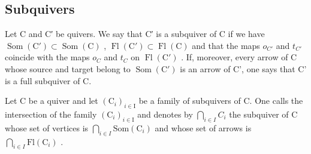 \subsection{Subquivers}

Let C and C′ be quivers. We say that C′ is a subquiver of C if we have \(\operatorname{Som}(\mathrm{C}') \subset \operatorname{Som}(\mathrm{C})\) , \(\operatorname{Fl}(\mathrm{C}') \subset \operatorname{Fl}(\mathrm{C})\) and that the maps \(o_{C'}\) and \(t_{C'}\) coincide with the maps \(o_{C}\) and \(t_{C}\) on \(\operatorname{Fl}(\mathrm{C}')\) . If, moreover, every arrow of C whose source and target belong to \(\operatorname{Som}(\mathrm{C}')\) is an arrow of C', one says that C' is a full subquiver of C.

Let C be a quiver and let \((\mathrm{C}_{i})_{i\in\mathrm{I}}\) be a family of subquivers of C. One calls the intersection of the family \((\mathrm{C}_{i})_{i\in\mathrm{I}}\) and denotes by \(\bigcap_{i\in I}C_{i}\) the subquiver of C whose set of vertices is \(\bigcap_{i\in I}\mathrm{Som}(\mathrm{C}_{i})\) and whose set of arrows is \(\bigcap_{i\in I}\mathrm{Fl}(\mathrm{C}_{i})\) .

